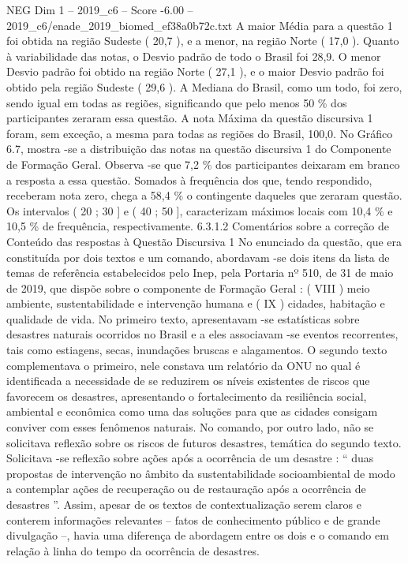 \begin{textsample}{NEG Dim 1 – 2019\_c6 – Score -6.00 – 2019\_c6/enade\_2019\_biomed\_ef38a0b72c.txt}
A maior Média para a questão 1 foi obtida na região Sudeste ( 20,7 ), e a menor, na região Norte ( 17,0 ).
Quanto à variabilidade das notas, o Desvio padrão de todo o Brasil foi 28,9.
O menor Desvio padrão foi obtido na região Norte ( 27,1 ), e o maior Desvio padrão foi obtido pela região Sudeste ( 29,6 ).
A Mediana do Brasil, como um todo, foi zero, sendo igual em todas as regiões, significando que pelo menos 50 \% dos participantes zeraram essa questão.
A nota Máxima da questão discursiva 1 foram, sem exceção, a mesma para todas as regiões do Brasil, 100,0.
No Gráfico 6.7, mostra -se a distribuição das notas na questão discursiva 1 do Componente de Formação Geral.
Observa -se que 7,2 \% dos participantes deixaram em branco a resposta a essa questão.
Somados à frequência dos que, tendo respondido, receberam nota zero, chega a 58,4 \% o contingente daqueles que zeraram questão.
Os intervalos ( 20 ; 30 ] e ( 40 ; 50 ], caracterizam máximos locais com 10,4 \% e 10,5 \% de frequência, respectivamente. 6.3.1.2 Comentários sobre a correção de Conteúdo das respostas à Questão Discursiva 1 No enunciado da questão, que era constituída por dois textos e um comando, abordavam -se dois itens da lista de temas de referência estabelecidos pelo Inep, pela Portaria nº 510, de 31 de maio de 2019, que dispõe sobre o componente de Formação Geral : ( VIII ) meio ambiente, sustentabilidade e intervenção humana e ( IX ) cidades, habitação e qualidade de vida.
No primeiro texto, apresentavam -se estatísticas sobre desastres naturais ocorridos no Brasil e a eles associavam -se eventos recorrentes, tais como estiagens, secas, inundações bruscas e alagamentos.
O segundo texto complementava o primeiro, nele constava um relatório da ONU no qual é identificada a necessidade de se reduzirem os níveis existentes de riscos que favorecem os desastres, apresentando o fortalecimento da resiliência social, ambiental e econômica como uma das soluções para que as cidades consigam conviver com esses fenômenos naturais.
No comando, por outro lado, não se solicitava reflexão sobre os riscos de futuros desastres, temática do segundo texto.
Solicitava -se reflexão sobre ações após a ocorrência de um desastre : “ duas propostas de intervenção no âmbito da sustentabilidade socioambiental de modo a contemplar ações de recuperação ou de restauração após a ocorrência de desastres ”.
Assim, apesar de os textos de contextualização serem claros e conterem informações relevantes – fatos de conhecimento público e de grande divulgação –, havia uma diferença de abordagem entre os dois e o comando em relação à linha do tempo da ocorrência de desastres.

\end{textsample}
